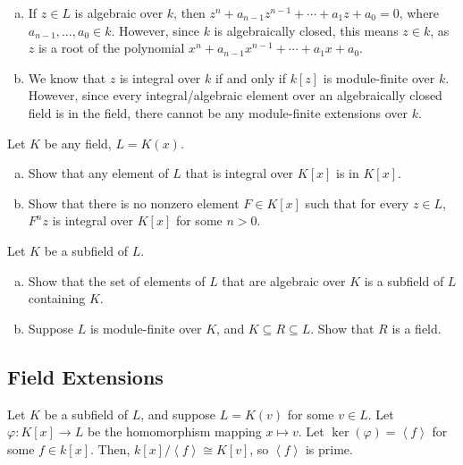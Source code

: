 \documentclass[10pt]{mypackage}
\begin{document}
\begin{solution}\hfill
  \begin{enumerate}[(a)]
    \item If $z\in L$ is algebraic over $k$, then $z^{n} + a_{n-1}z^{n-1} + \cdots + a_1 z + a_0 = 0$, where $a_{n-1},\dots,a_0\in k$. However, since $k$ is algebraically closed, this means $z\in k$, as $z$ is a root of the polynomial $x^{n} + a_{n-1}x^{n-1} + \cdots + a_1 x + a_0$.
    \item We know that $z$ is integral over $k$ if and only if $k\left[ z \right]$ is module-finite over $k$. However, since every integral/algebraic element over an algebraically closed field is in the field, there cannot be any module-finite extensions over $k$.
  \end{enumerate}
\end{solution}

\begin{exercise}[Exercise 1.49]
  Let $K$ be any field, $L=  K(x)$.
  \begin{enumerate}[(a)]
    \item Show that any element of $L$ that is integral over $K\left[ x \right]$ is in $K\left[ x \right]$.
    \item Show that there is no nonzero element $F\in K\left[ x \right]$ such that for every $z\in L$, $F^{n}z$ is integral over $K\left[ x \right]$ for some $n > 0$.
  \end{enumerate}
\end{exercise}
\begin{exercise}[Exercise 1.50]
  Let $K$ be a subfield of $L$.
  \begin{enumerate}[(a)]
    \item Show that the set of elements of $L$ that are algebraic over $K$ is a subfield of $L$ containing $K$.
    \item Suppose $L$ is module-finite over $K$, and $K\subseteq R\subseteq L$. Show that $R$ is a field.
  \end{enumerate}
\end{exercise}
\subsection{Field Extensions}%
Let $K$ be a subfield of $L$, and suppose $L = K(v)$ for some $v\in L$. Let $\varphi\colon K\left[ x \right]\rightarrow L$ be the homomorphism mapping $x\mapsto v$. Let $\ker\left( \varphi \right) = \left\langle f \right\rangle$ for some $f\in k\left[ x \right]$. Then, $k\left[ x \right]/\left\langle f \right\rangle\cong K\left[ v \right]$, so $\left\langle f \right\rangle$ is prime.\newline
\end{document}
